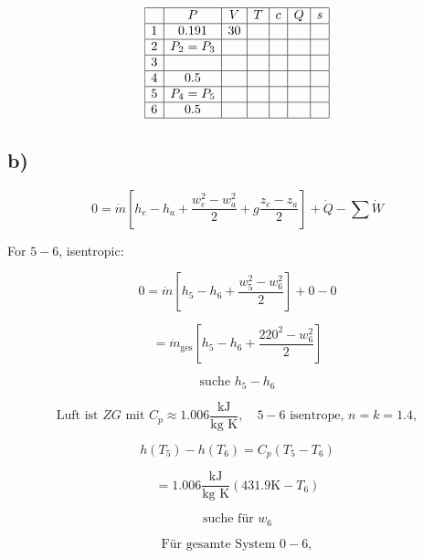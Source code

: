 \[
\begin{array}{|c|c|c|c|c|c|c|}
\hline
 & P & V & T & c & Q & s \\
\hline
1 & 0.191 & 30 & & & & \\
\hline
2 & P_2 = P_3 & & & & & \\
\hline
3 & & & & & & \\
\hline
4 & 0.5 & & & & & \\
\hline
5 & P_4 = P_5 & & & & & \\
\hline
6 & 0.5 & & & & & \\
\hline
\end{array}
\]

\subsection*{b)}

\[
0 = \dot{m} \left[ h_e - h_a + \frac{w_e^2 - w_a^2}{2} + g \frac{z_e - z_a}{2} \right] + \dot{Q} - \sum \dot{W}
\]

For $5-6$, isentropic:

\[
0 = \dot{m} \left[ h_5 - h_6 + \frac{w_5^2 - w_6^2}{2} \right] + 0 - 0
\]

\[
= \dot{m}_{\text{ges}} \left[ h_5 - h_6 + \frac{220^2 - w_6^2}{2} \right]
\]

\[
\text{suche } h_5 - h_6
\]

\[
\text{Luft ist } ZG \text{ mit } C_p \approx 1.006 \frac{\text{kJ}}{\text{kg K}}, \quad 5-6 \text{ isentrope, } n = k = 1.4,
\]

\[
h(T_5) - h(T_6) = C_p (T_5 - T_6)
\]

\[
= 1.006 \frac{\text{kJ}}{\text{kg K}} (431.9 \text{K} - T_6)
\]

\[
\text{suche für } w_6
\]

\[
\text{Für gesamte System } 0-6,
\]

